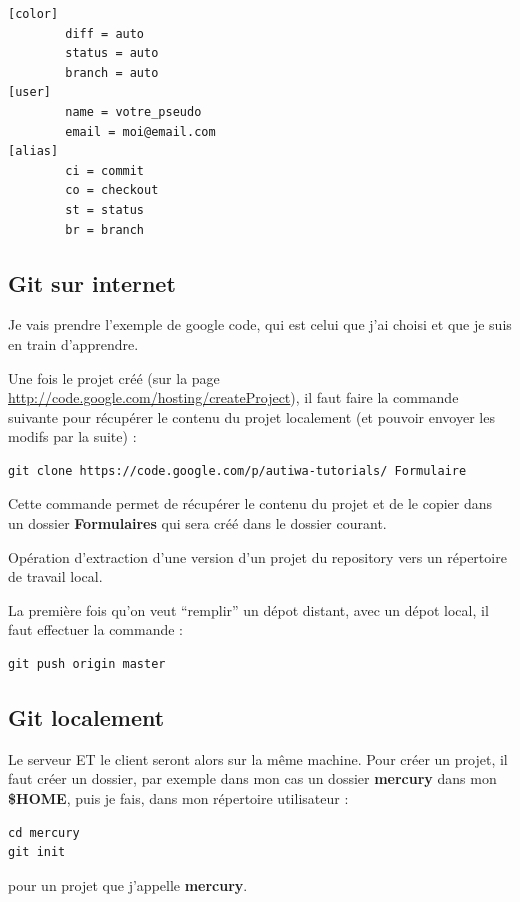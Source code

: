 \documentclass[a4paper,twoside]{article}
\begin{document}
\begin{verbatim}
[color]
        diff = auto
        status = auto
        branch = auto
[user]
        name = votre_pseudo
        email = moi@email.com
[alias]
        ci = commit
        co = checkout
        st = status
        br = branch
\end{verbatim}

\subsection{Git sur internet}
Je vais prendre l'exemple de google code, qui est celui que j'ai choisi et que je suis en train d'apprendre.


Une fois le projet créé (sur la page \url{http://code.google.com/hosting/createProject}), il faut faire la commande suivante pour récupérer le contenu du projet localement (et pouvoir envoyer les modifs par la suite) : 
\begin{verbatim}
git clone https://code.google.com/p/autiwa-tutorials/ Formulaire
\end{verbatim}

Cette commande permet de récupérer le contenu du projet et de le copier dans un dossier \textbf{Formulaires} qui sera créé dans le dossier courant.

\begin{definition}[Clone]
Opération d'extraction d'une version d'un projet du repository vers un répertoire de travail local.
\end{definition}

\begin{remarque}
La première fois qu'on veut ``remplir'' un dépot distant, avec un dépot local, il faut effectuer la commande : 
\begin{verbatim}
git push origin master
\end{verbatim}

\end{remarque}



\subsection{Git localement}\label{sec:git_init}
Le serveur ET le client seront alors sur la même machine. Pour créer un projet, il faut créer un dossier, par exemple dans mon cas un dossier \textbf{mercury} dans mon \textbf{\$HOME}, puis je fais, dans mon répertoire utilisateur : 
\begin{verbatim}
cd mercury
git init
\end{verbatim}
pour un projet que j'appelle \textbf{mercury}.
\end{document}
